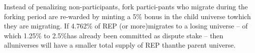 \documentclass[12pt,floatfix,reprint,nofootinbib,amsmath,amssymb,epsfig,pre,floats,letterpaper,groupedaffiliation]{revtex4-1}
\theoremstyle{definition}
\theoremstyle{definition}
\begin{document}
Instead of penalizing non-participants, fork partici-\linebreak pants who migrate during the forking period are re-\linebreak warded by minting a 5\% bonus in the child universe to\linebreak which they are migrating. If 4.762\% of REP (or more)\linebreak migrates to a losing universe -- of which 1.25\% to 2.5\%\linebreak has already been committed as dispute stake -- then all\linebreak universes will have a smaller total supply of REP than\linebreak the parent universe.
\end{document}
